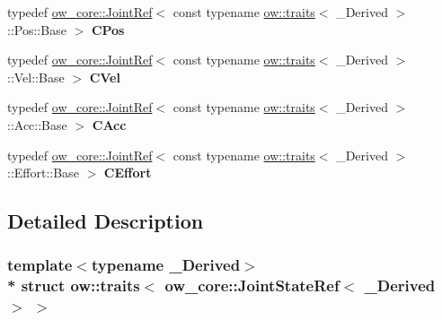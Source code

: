 \begin{DoxyCompactItemize}
\item 
typedef \hyperlink{classow__core_1_1JointRef}{ow\+\_\+core\+::\+Joint\+Ref}$<$ const typename \hyperlink{structow_1_1traits}{ow\+::traits}$<$ \+\_\+\+Derived $>$\+::Pos\+::\+Base $>$ {\bfseries C\+Pos}\hypertarget{structow_1_1traits_3_01ow__core_1_1JointStateRef_3_01__Derived_01_4_01_4_a3c7cbe3fce289552d794246f8dbf0e98}{}\label{structow_1_1traits_3_01ow__core_1_1JointStateRef_3_01__Derived_01_4_01_4_a3c7cbe3fce289552d794246f8dbf0e98}

\item 
typedef \hyperlink{classow__core_1_1JointRef}{ow\+\_\+core\+::\+Joint\+Ref}$<$ const typename \hyperlink{structow_1_1traits}{ow\+::traits}$<$ \+\_\+\+Derived $>$\+::Vel\+::\+Base $>$ {\bfseries C\+Vel}\hypertarget{structow_1_1traits_3_01ow__core_1_1JointStateRef_3_01__Derived_01_4_01_4_ab9f6458556d3256180cbf8b4c8e4078b}{}\label{structow_1_1traits_3_01ow__core_1_1JointStateRef_3_01__Derived_01_4_01_4_ab9f6458556d3256180cbf8b4c8e4078b}

\item 
typedef \hyperlink{classow__core_1_1JointRef}{ow\+\_\+core\+::\+Joint\+Ref}$<$ const typename \hyperlink{structow_1_1traits}{ow\+::traits}$<$ \+\_\+\+Derived $>$\+::Acc\+::\+Base $>$ {\bfseries C\+Acc}\hypertarget{structow_1_1traits_3_01ow__core_1_1JointStateRef_3_01__Derived_01_4_01_4_a2f5343192fbf1cb524bafd36eb7baf2a}{}\label{structow_1_1traits_3_01ow__core_1_1JointStateRef_3_01__Derived_01_4_01_4_a2f5343192fbf1cb524bafd36eb7baf2a}

\item 
typedef \hyperlink{classow__core_1_1JointRef}{ow\+\_\+core\+::\+Joint\+Ref}$<$ const typename \hyperlink{structow_1_1traits}{ow\+::traits}$<$ \+\_\+\+Derived $>$\+::Effort\+::\+Base $>$ {\bfseries C\+Effort}\hypertarget{structow_1_1traits_3_01ow__core_1_1JointStateRef_3_01__Derived_01_4_01_4_a7cda9eed5c7cfcfe04f5ec99562ba030}{}\label{structow_1_1traits_3_01ow__core_1_1JointStateRef_3_01__Derived_01_4_01_4_a7cda9eed5c7cfcfe04f5ec99562ba030}

\end{DoxyCompactItemize}


\subsection{Detailed Description}
\subsubsection*{template$<$typename \+\_\+\+Derived$>$\\*
struct ow\+::traits$<$ ow\+\_\+core\+::\+Joint\+State\+Ref$<$ \+\_\+\+Derived $>$ $>$}

